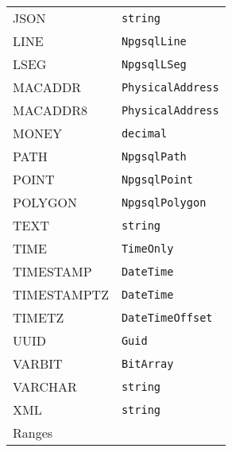 \documentclass[sigconf,techreport,authorversion,nonacm]{acmart}
\begin{document}
\begin{table}[!htbp]
\begin{tabular}{l | l}
                JSON                                   & \texttt{string}                         \\
                LINE                                   & \texttt{NpgsqlLine}                     \\
                LSEG                                   & \texttt{NpgsqlLSeg}                     \\
                MACADDR                                & \texttt{PhysicalAddress}                \\
                MACADDR8                               & \texttt{PhysicalAddress}                \\
                MONEY                                  & \texttt{decimal}                        \\
                PATH                                   & \texttt{NpgsqlPath}                     \\
                POINT                                  & \texttt{NpgsqlPoint}                    \\
                POLYGON                                & \texttt{NpgsqlPolygon}                  \\
                TEXT                                   & \texttt{string}                         \\
                TIME                                   & \texttt{TimeOnly}                       \\
                TIMESTAMP                              & \texttt{DateTime}                       \\
                TIMESTAMPTZ                            & \texttt{DateTime}                       \\
                TIMETZ                                 & \texttt{DateTimeOffset}                 \\
                UUID                                   & \texttt{Guid}                           \\
                VARBIT                                 & \texttt{BitArray}                       \\
                VARCHAR                                & \texttt{string}                         \\
                XML                                    & \texttt{string}                         \\ \midrule
                \multicolumn{2}{l}{Ranges}                                                       \\ \midrule

\end{tabular}
\end{table}
\end{document}
